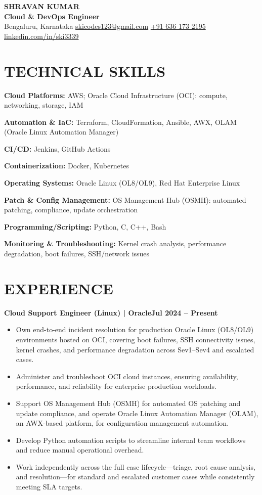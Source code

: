 \documentclass[a4paper,10pt]{extarticle}
\newcommand{\skill}[2]{\textbf{#1:} #2\par\vspace{0.7pt}}
\begin{document}
\begin{center}
  {\Large\bfseries SHRAVAN KUMAR}\\[3pt]
  \textbf{Cloud \& DevOps Engineer}\\[4pt]
  Bengaluru, Karnataka \textbar{}
  \href{mailto:skicodes123@gmail.com}{skicodes123@gmail.com} \textbar{}
  \href{tel:+916361732195}{+91 636 173 2195} \textbar{}
  \href{https://www.linkedin.com/in/ski3339}{linkedin.com/in/ski3339}
\end{center}

\section*{TECHNICAL SKILLS}
\skill{Cloud Platforms}{AWS; Oracle Cloud Infrastructure (OCI): compute, networking, storage, IAM}
\skill{Automation \& IaC}{Terraform, CloudFormation, Ansible, AWX, OLAM (Oracle Linux Automation Manager)}
\skill{CI/CD}{Jenkins, GitHub Actions}
\skill{Containerization}{Docker, Kubernetes}
\skill{Operating Systems}{Oracle Linux (OL8/OL9), Red Hat Enterprise Linux}
\skill{Patch \& Config Management}{OS Management Hub (OSMH): automated patching, compliance, update orchestration}
\skill{Programming/Scripting}{Python, C, C++, Bash}
\skill{Monitoring \& Troubleshooting}{Kernel crash analysis, performance degradation, boot failures, SSH/network issues}

\section*{EXPERIENCE}
\textbf{Cloud Support Engineer (Linux) | Oracle}\hfill\textbf{Jul 2024 -- Present}\par
\begin{itemize}
  \item Own end-to-end incident resolution for production Oracle Linux (OL8/OL9)
  environments hosted on OCI, covering boot failures, SSH connectivity issues,
  kernel crashes, and performance degradation across Sev1--Sev4 and escalated cases.
  \item Administer and troubleshoot OCI cloud instances, ensuring availability,
  performance, and reliability for enterprise production workloads.
  \item Support OS Management Hub (OSMH) for automated OS patching and update
  compliance, and operate Oracle Linux Automation Manager (OLAM), an AWX-based
  platform, for configuration management automation.
  \item Develop Python automation scripts to streamline internal team workflows
  and reduce manual operational overhead.
  \item Work independently across the full case lifecycle---triage, root cause
  analysis, and resolution---for standard and escalated customer cases while
  consistently meeting SLA targets.
\end{itemize}
\end{document}
